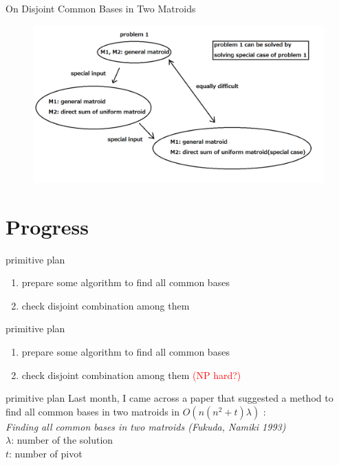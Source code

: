 \documentclass[11pt,xcolor=dvipsnames,table,dvipdfmx]{beamer}
\begin{document}
\begin{frame}{On Disjoint Common Bases in Two Matroids}
 \begin{figure}
  \centering
  \includegraphics[width=12cm]{problem1.png}
 \end{figure}
\end{frame}


\section{Progress}
\begin{frame}{primitive plan}
\begin{enumerate}
 \item prepare some algorithm to find all common bases
 \item check disjoint combination among them
\end{enumerate}
\end{frame}


\begin{frame}{primitive plan}
\begin{enumerate}
 \item prepare some algorithm to find all common bases
 \item check disjoint combination among them \textcolor{red}{(NP hard?)}
\end{enumerate}
\end{frame}


\begin{frame}{primitive plan}
 Last month, I came across a paper that suggested a method to find all common bases in two matroids in $O(n(n^2 + t)\lambda)$ : \\
 {\it Finding all common bases in two matroids (Fukuda, Namiki 1993)} \\
 $\lambda$: number of the solution \\
 $t$: number of pivot
\end{frame}
\end{document}
